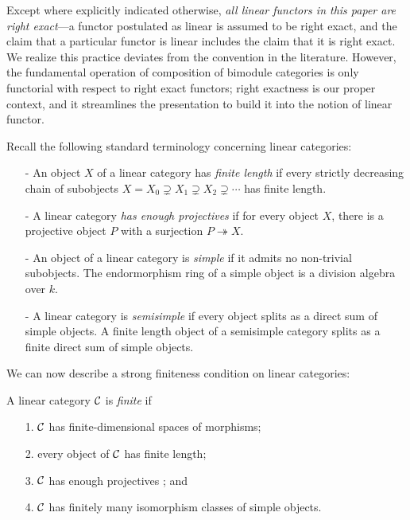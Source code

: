 \documentclass{amsart}
\begin{document}
\begin{warning}
Except where explicitly indicated otherwise, \emph{all linear functors in this paper are right exact}---a functor postulated as linear is assumed to be right exact, and the claim that a particular functor is linear includes the claim that it is right exact.  We realize this practice deviates from the convention in the literature.  However, the fundamental operation of composition of bimodule categories is only functorial with respect to right exact functors; right exactness is our proper context, and it streamlines the presentation to build it into the notion of linear functor.
\end{warning}

Recall the following standard terminology concerning linear categories:
\begin{itemize}
	\item[-] An object $X$ of a linear category has {\em finite length} if every strictly decreasing chain of subobjects $X = X_0 \supsetneq X_1 \supsetneq X_2 \supsetneq  \cdots$ has finite length. 
	\item[-] A linear category {\em has enough projectives} if for every object $X$, there is a projective object $P$ with a surjection $P \twoheadrightarrow X$. 
	\item[-] An object of a linear category is {\em simple} if it admits no non-trivial subobjects. The endormorphism ring of a simple object is a division algebra over $k$. %
	\item[-] A linear category is {\em semisimple} if every object splits as a direct sum of simple objects.  A finite length object of a semisimple category splits as a finite direct sum of simple objects.  %
\end{itemize}

We can now describe a strong finiteness condition on linear categories:
\begin{definition} %
	A linear category $\mathcal C$ is {\em finite} if 
	\begin{enumerate}
		\item[1.] $\mathcal C$ has finite-dimensional spaces of morphisms;
		\item[2.] every object of $\mathcal C$ has finite length;
		\item[3.] $\mathcal C$ has enough projectives%
		; and
		\item[4.] $\mathcal C$ has finitely many isomorphism classes of simple objects.  
	\end{enumerate}
\end{definition}
\end{document}
